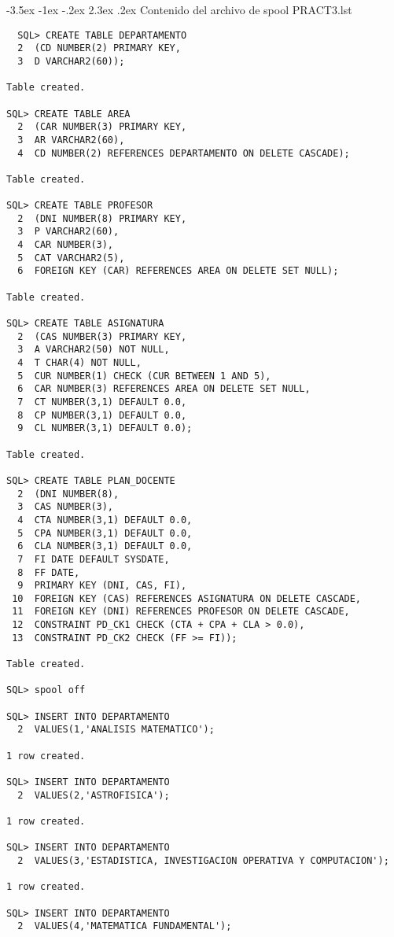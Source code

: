 \documentclass[11pt]{report}
\makeatletter
\renewcommand\chapter{\@startsection{chapter}{0}{\z@}%
    {-3.5ex \@plus -1ex \@minus -.2ex}%
    {2.3ex \@plus.2ex}%
    {\normalfont\Large\bfseries}}
\makeatother
\begin{document}
\chapter{Contenido del archivo de spool PRACT3.lst}
\begin{verbatim}
  SQL> CREATE TABLE DEPARTAMENTO
  2  (CD NUMBER(2) PRIMARY KEY,
  3  D VARCHAR2(60));

Table created.

SQL> CREATE TABLE AREA
  2  (CAR NUMBER(3) PRIMARY KEY,
  3  AR VARCHAR2(60),
  4  CD NUMBER(2) REFERENCES DEPARTAMENTO ON DELETE CASCADE);

Table created.

SQL> CREATE TABLE PROFESOR
  2  (DNI NUMBER(8) PRIMARY KEY,
  3  P VARCHAR2(60),
  4  CAR NUMBER(3),
  5  CAT VARCHAR2(5),
  6  FOREIGN KEY (CAR) REFERENCES AREA ON DELETE SET NULL);

Table created.

SQL> CREATE TABLE ASIGNATURA
  2  (CAS NUMBER(3) PRIMARY KEY,
  3  A VARCHAR2(50) NOT NULL,
  4  T CHAR(4) NOT NULL,
  5  CUR NUMBER(1) CHECK (CUR BETWEEN 1 AND 5),
  6  CAR NUMBER(3) REFERENCES AREA ON DELETE SET NULL,
  7  CT NUMBER(3,1) DEFAULT 0.0,
  8  CP NUMBER(3,1) DEFAULT 0.0,
  9  CL NUMBER(3,1) DEFAULT 0.0);

Table created.

SQL> CREATE TABLE PLAN_DOCENTE
  2  (DNI NUMBER(8),
  3  CAS NUMBER(3),
  4  CTA NUMBER(3,1) DEFAULT 0.0,
  5  CPA NUMBER(3,1) DEFAULT 0.0,
  6  CLA NUMBER(3,1) DEFAULT 0.0,
  7  FI DATE DEFAULT SYSDATE,
  8  FF DATE,
  9  PRIMARY KEY (DNI, CAS, FI),
 10  FOREIGN KEY (CAS) REFERENCES ASIGNATURA ON DELETE CASCADE,
 11  FOREIGN KEY (DNI) REFERENCES PROFESOR ON DELETE CASCADE,
 12  CONSTRAINT PD_CK1 CHECK (CTA + CPA + CLA > 0.0),
 13  CONSTRAINT PD_CK2 CHECK (FF >= FI));

Table created.

SQL> spool off

SQL> INSERT INTO DEPARTAMENTO
  2  VALUES(1,'ANALISIS MATEMATICO');

1 row created.

SQL> INSERT INTO DEPARTAMENTO
  2  VALUES(2,'ASTROFISICA');

1 row created.

SQL> INSERT INTO DEPARTAMENTO
  2  VALUES(3,'ESTADISTICA, INVESTIGACION OPERATIVA Y COMPUTACION');

1 row created.

SQL> INSERT INTO DEPARTAMENTO
  2  VALUES(4,'MATEMATICA FUNDAMENTAL');


\end{verbatim}
\end{document}
